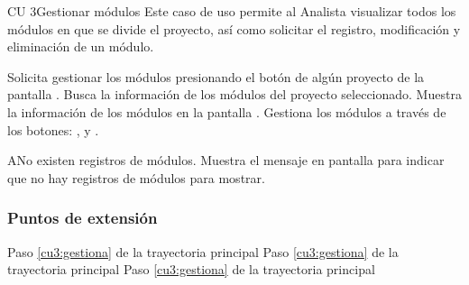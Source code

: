 \begin{UseCase}{CU 3}{Gestionar módulos}
	{
		Este caso de uso permite al Analista visualizar todos los módulos en que se divide el proyecto, así como solicitar el registro, modificación y eliminación de un módulo.
	}
	
	

	


\end{UseCase}
 \begin{UCtrayectoria}
    \UCpaso[\UCactor] Solicita gestionar los módulos presionando el botón \btnEntrar de algún proyecto de la pantalla .
    \UCpaso[\UCsist] Busca la información de los módulos del proyecto seleccionado. 
    \UCpaso[\UCsist] Muestra la información de los módulos en la pantalla .
    \UCpaso[\UCactor] Gestiona los módulos a través de los botones: , \btnEditar y \btnEliminar. \label{cu3:gestiona}
 \end{UCtrayectoria}
 
 \begin{UCtrayectoriaA}{A}{No existen registros de módulos.}
    \UCpaso[\UCsist] Muestra el mensaje  en pantalla  
    para indicar que no hay registros de módulos para mostrar.
 \end{UCtrayectoriaA}
 

\subsubsection{Puntos de extensión}

	{Paso \ref{cu3:gestiona} de la trayectoria principal}
	{}
	{Paso \ref{cu3:gestiona} de la trayectoria principal}
	{}	
	{Paso \ref{cu3:gestiona} de la trayectoria principal}
	{}